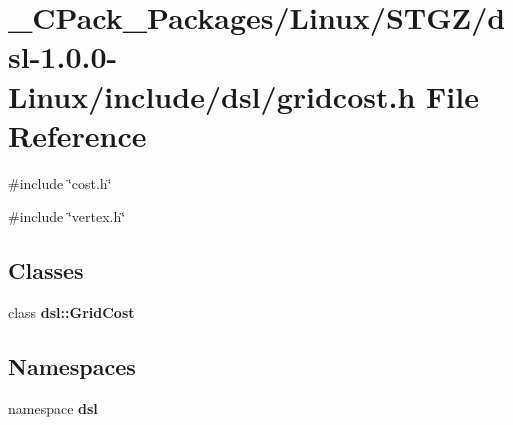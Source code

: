 \section{\_\-CPack\_\-Packages/Linux/STGZ/dsl-\/1.0.0-\/Linux/include/dsl/gridcost.h File Reference}
\label{__CPack__Packages_2Linux_2STGZ_2dsl-1_80_80-Linux_2include_2dsl_2gridcost_8h}
{\ttfamily \#include \char`\"{}cost.h\char`\"{}}\par
{\ttfamily \#include \char`\"{}vertex.h\char`\"{}}\par
\subsection*{Classes}
\begin{DoxyCompactItemize}
\item 
class {\bf dsl::GridCost}
\end{DoxyCompactItemize}
\subsection*{Namespaces}
\begin{DoxyCompactItemize}
\item 
namespace {\bf dsl}
\end{DoxyCompactItemize}

